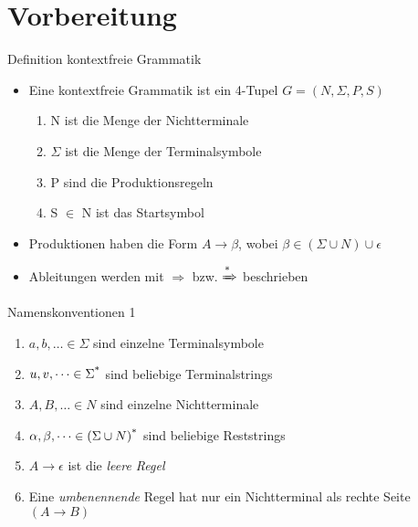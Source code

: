 \documentclass[
10pt,
pantone315, 	%
]{beamer}
\begin{document}
\section{Vorbereitung}
\begin{frame}[t]{Definition kontextfreie Grammatik}
	\begin{itemize}[<+->]
		\item
		Eine kontextfreie Grammatik ist ein 4-Tupel $G = (N, \Sigma , P, S)$
		\begin{enumerate}
			\item
			N ist die Menge der Nichtterminale
			\item
			$\Sigma$ ist die Menge der Terminalsymbole
			\item
			P sind die Produktionsregeln
			\item
			S $\in$ N ist das Startsymbol
		\end{enumerate}
		\item
		Produktionen haben die Form $A \rightarrow \beta$, wobei $\beta \in (\Sigma \cup N) \cup \epsilon$
		\item
		Ableitungen werden mit $\Rightarrow$ bzw. $\xRightarrow{\text{*}}$ beschrieben
	\end{itemize}
\end{frame}

\begin{frame}[t]{Namenskonventionen 1}
	\begin{enumerate}
	
	
		\item
		$a,b,\dots\in\Sigma$ sind einzelne Terminalsymbole
		\item 
		$u,v, \dots\in\Sigma\textsuperscript{*}$ sind beliebige Terminalstrings
		\item
		$A,B,\dots\in N$ sind einzelne Nichtterminale
		\item
		$\alpha,\beta,\dots\in (\Sigma \cup N)\textsuperscript{*}$ sind beliebige Reststrings
		\item
		$A \rightarrow \epsilon $ ist die \textit{leere Regel}
		\item
		Eine \textit{umbenennende} Regel hat nur ein Nichtterminal als rechte Seite $\left( A \rightarrow B \right)$

	\end{enumerate}
\end{frame}
\end{document}
